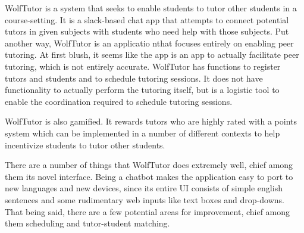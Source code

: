 
WolfTutor is a system that seeks to enable students to tutor other students in a
course-setting. It is a slack-based chat app that attempts to connect potential
tutors in given subjects with students who need help with those subjects. Put
another way, WolfTutor is an applicatio nthat focuses entirely on enabling 
peer tutoring. At first blush, it seems like the app is an app to actually
facilitate peer tutoring, which is not entirely accurate. WolfTutor has
functions to register tutors and students and to schedule tutoring sessions. It
does not have functionality to actually perform the tutoring itself, but is a
logistic tool to enable the coordination required to schedule tutoring sessions.

WolfTutor is also gamified. It rewards tutors who are highly rated with a points
system which can be implemented in a number of different contexts to help
incentivize students to tutor other students.

There are a number of things that WolfTutor does extremely well, chief among
them its novel interface.  Being a chatbot makes the application easy to port to
new languages and new devices, since its entire UI consists of simple english
sentences and some rudimentary web inputs like text boxes and drop-downs.  That
being said, there are a few potential areas for improvement, chief among them
scheduling and tutor-student matching. 

